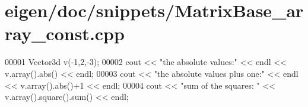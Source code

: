 \hypertarget{eigen_2doc_2snippets_2_matrix_base__array__const_8cpp_source}{}\section{eigen/doc/snippets/\+Matrix\+Base\+\_\+array\+\_\+const.cpp}
\label{eigen_2doc_2snippets_2_matrix_base__array__const_8cpp_source}

\begin{DoxyCode}
00001 Vector3d v(-1,2,-3);
00002 cout << \textcolor{stringliteral}{"the absolute values:"} << endl << v.array().abs() << endl;
00003 cout << \textcolor{stringliteral}{"the absolute values plus one:"} << endl << v.array().abs()+1 << endl;
00004 cout << \textcolor{stringliteral}{"sum of the squares: "} << v.array().square().sum() << endl;
\end{DoxyCode}
